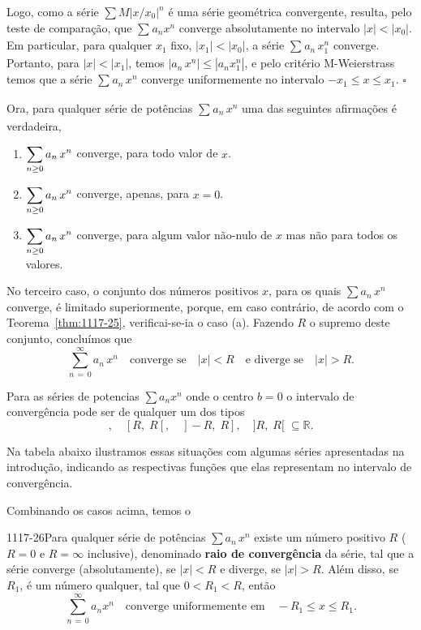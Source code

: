 Logo, como a série $\sum M\left|{x}/{x_{0}}\right|^{n}$ é uma série geométrica
convergente, resulta, pelo teste de comparação, que
$\sum_{}a_nx^{n}$ converge absolutamente no intervalo
$|x| <| x_{0}|$. Em particular, para qualquer $x_1$ fixo, $|x_1| <
|x_{0}|$, a série $\sum_{}a_n\,x_1^{n}$ converge. Portanto,
para $|x|<|x_1|$, temos $|a_n\,x^n|\leq |a_nx_1^n|$, e pelo
critério M-Weierstrass temos que a série $\sum_{}a_{n}\,x^{n}$ converge uniformemente no intervalo 
$- x_{1}\leq x\leq  x_{1}$. \hfill $\square$


Ora, para qualquer série de potências $\sum_{}a_n\,x^{n}$ uma das seguintes afirmações é verdadeira,
\begin{enumerate}[label=(\alph*),leftmargin=2.0cm,ref=(\alph*)]
  \item $\displaystyle{\sum_{n\geq 0}a_n\,x^n}$ converge, para todo valor de $x$.
  \item $\displaystyle{\sum_{n\geq 0}a_n\,x^n}$ converge, apenas, para $x = 0$.
  \item $\displaystyle{\sum_{n\geq 0}a_n\, x^n}$ converge, para algum valor não-nulo de $x$ mas não
 para todos os valores.
\end{enumerate}

No terceiro caso, o conjunto dos números positivos $x$, para os
quais $\sum a_{n}\,x^{n}$ converge, é limitado
superiormente, porque, em caso contrário, de acordo com o
Teorema~\ref{thm:1117-25}, verificai-se-ia o caso (a). Fazendo $R$ o
supremo deste conjunto, concluímos que 
\begin{equation*}
\sum_{n\,=\, 0}^{\infty}a_n\,x^n\quad  \text{converge se}\quad |x| < R\quad  \text{e diverge se}\quad  |x| > R.
\end{equation*}

Para as séries de potencias \(\sum a_{n}x^{n}\) onde o centro \(b=0\) 
o intervalo de convergência pode ser de qualquer um dos tipos 
\begin{equation*}
[-R,\; R], \quad  [R, \; R[,\quad ]-R,\; R],\quad  ]R,\; R[ \;  \subseteq \mathbb{R}. 
\end{equation*}

Na tabela abaixo ilustramos essas situações com algumas séries apresentadas na introdução, indicando as 
respectivas funções que elas representam no intervalo de convergência. 
\begin{table}[H]
\centering


\end{table}


Combinando os casos acima, temos o
\begin{theoc}{}{1117-26}Para qualquer série de potências
$\sum a_{n}\,x^{n}$ existe um número positivo $R$ ($R
= 0$ e $R =\infty$ inclusive), denominado \textbf{raio de convergência} da
série, tal que a série converge (absolutamente), se $|x|<R$ e
diverge, se $|x|> R$. Além disso, se $R_1$, é um número qualquer,
tal que $0 < R_1< R$, então 
\begin{equation*}
\sum_{n\, =\, 0}^{\infty}a_{n}x^{n}\quad  \text{converge uniformemente em} \quad -R_{1}\leq x \leq  R_{1}.
\end{equation*}
\end{theoc}

